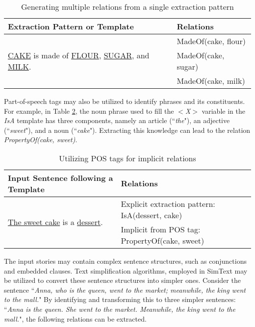 \begin{table}[ht]   %
\centering
\caption{Generating multiple relations from a single extraction pattern} \vspace{0.25em}
\begin{tabular}{|l|l|} \hline
Extraction Pattern or Template & Relations \\ \hline
\multirow{3}{*}{\underline{CAKE} is made of \underline{FLOUR}, \underline{SUGAR}, and \underline{MILK}.} & MadeOf(cake, flour) \\
 & MadeOf(cake, sugar) \\
 & MadeOf(cake, milk) \\ \hline
\end{tabular}
\label{tab:multiplerelationssingle}
\end{table}

Part-of-speech tags may also be utilized to identify phrases and its constituents. For example, in Table \ref{tab:utilizeposforimplicit}, the noun phrase used to fill the \textit{$<$X$>$} variable in the \textit{IsA} template has three components, namely an article (``\textit{the}"), an adjective (``\textit{sweet}"), and a noun (``\textit{cake}"). Extracting this knowledge can lead to the relation \textit{PropertyOf(cake, sweet)}. 

\begin{table}[ht]   %
\centering
\caption{Utilizing POS tags for implicit relations} \vspace{0.25em}
\begin{tabular}{|l|p{6cm}|} \hline
Input Sentence following a Template & Relations \\ \hline
\multirow{2}{*}{\underline{The sweet cake} is a \underline{dessert}.} & Explicit extraction pattern: IsA(dessert, cake) \\
 & Implicit from POS tag: PropertyOf(cake, sweet) \\ \hline
\end{tabular}
\label{tab:utilizeposforimplicit}
\end{table}

The input stories may contain complex sentence structures, such as conjunctions and embedded clauses. Text simplification algorithms, employed in SimText \cite{Damay:2007} may be utilized to convert these sentence structures into simpler ones. Consider the sentence ``\textit{Anna, who is the queen, went to the market; meanwhile, the king went to the mall.}" By identifying and transforming this to three simpler sentences: ``\textit{Anna is the queen. She went to the market. Meanwhile, the king went to the mall.}", the following relations can be extracted. 

